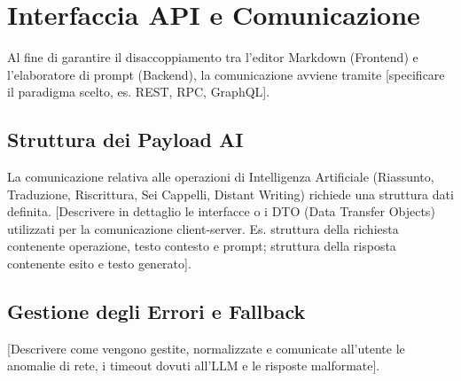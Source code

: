 \section{Interfaccia API e Comunicazione}

Al fine di garantire il disaccoppiamento tra l'editor Markdown (Frontend) e l'elaboratore di prompt (Backend), la comunicazione avviene tramite [specificare il paradigma scelto, es. REST, RPC, GraphQL].

\subsection{Struttura dei Payload AI}
La comunicazione relativa alle operazioni di Intelligenza Artificiale (Riassunto, Traduzione, Riscrittura, Sei Cappelli, Distant Writing) richiede una struttura dati definita.
[Descrivere in dettaglio le interfacce o i DTO (Data Transfer Objects) utilizzati per la comunicazione client-server. Es. struttura della richiesta contenente operazione, testo contesto e prompt; struttura della risposta contenente esito e testo generato].

\subsection{Gestione degli Errori e Fallback}
[Descrivere come vengono gestite, normalizzate e comunicate all'utente le anomalie di rete, i timeout dovuti all'LLM e le risposte malformate].